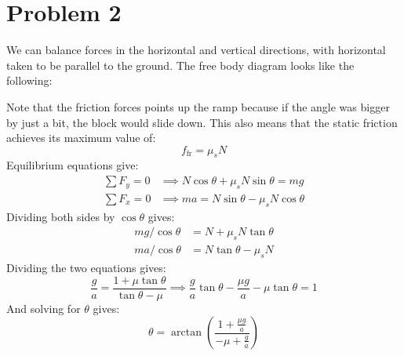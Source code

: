 \documentclass{article}
\begin{document}
\section*{Problem 2}
We can balance forces in the horizontal and vertical directions, with horizontal taken to be parallel to the ground. The free body diagram looks like the following:
\begin{center}
\end{center}
Note that the friction forces points up the ramp because if the angle was bigger by just a bit, the block would slide down. This also means that the static friction achieves its maximum value of:
\begin{equation}
    f_\text{fr} = \mu_sN
    \label{eq:}
\end{equation}
Equilibrium equations give:
\begin{align}
    \sum F_y = 0 &\implies N\cos\theta + \mu_sN\sin\theta = mg \\ 
    \sum F_x = 0 &\implies ma = N\sin\theta - \mu_sN\cos\theta
\end{align}
Dividing both sides by $\cos\theta$ gives:
\begin{align}
    mg/\cos\theta &= N + \mu_sN\tan\theta \\ 
    ma/\cos\theta &= N\tan\theta - \mu_sN
\end{align}
Dividing the two equations gives:
\begin{equation}
    \frac{g}{a} = \frac{1+\mu \tan\theta}{\tan\theta-\mu} \implies \frac{g}{a}\tan\theta - \frac{\mu g}{a} - \mu\tan\theta = 1
    \label{eq:}
\end{equation}
And solving for $\theta$ gives:
\begin{equation}
    \theta = \arctan\left(\frac{1+\frac{\mu g}{a}}{-\mu + \frac{g}{a}}\right)
    \label{eq:}
\end{equation}
\end{document}
